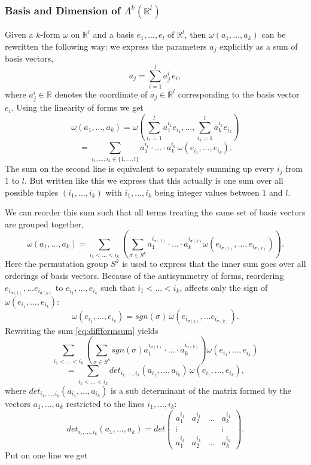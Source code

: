 \subsubsection{Basis and Dimension of $\Lambda^k(\mathbb R^l)$}
Given a $k$-form $\omega$ on $\mathbb R^l$ and a basis $e_1,...,e_l$ of $\mathbb R^l$, then $\omega(a_1,...,a_k)$ can be rewritten the following way: we express the parameters $a_j$ explicitly as a sum of basis vectors,
\[a_j = \sum_{i=1}^l a_j^i\,e_i,\]
where $a_j^i\in \mathbb R$ denotes the coordinate of $a_j \in \mathbb R^l$ corresponding to the basis vector $e_i$.
Using the linearity of forms we get
\[\omega(a_1,...,a_k) = \omega(\sum_{i_1=1}^la_1^{i_1}e_{i_1},...,\sum_{i_k=1}^la_k^{i_k}e_{i_k})\]
\[= \sum_{i_1,...,i_k \in\{1,...,l\}}a_1^{i_1}\cdot ... \cdot a_k^{i_k} \,\omega(e_{i_1},...,e_{i_k}).\]
The sum on the second line is equivalent to  separately summing up every $i_j$ from $1$ to $l$. But written like this we express that this actually is one sum over all possible tuples $(i_1,...,i_k)$ with $i_1,...,i_k$ being integer values between $1$ and $l$.

We can reorder this sum such that all terms treating the same set of basis vectors are grouped together,
\begin{equation}\omega(a_1,...,a_k) =\sum_{i_1<...<i_k}\left(\sum_{\sigma \in S^k} a_1^{i_{\sigma(1)}}\cdot ... \cdot a_k^{i_{\sigma(k)}} \omega(e_{i_{\sigma(1)}},...,e_{i_{\sigma(k)}})\right).\label{eq:diffformsum}\end{equation}
Here the permutation group $S^k$ is used to express that the inner sum goes over all orderings of basis vectors. Because of the antisymmetry of forms, reordering $e_{i_{\sigma(1)}},...e_{i_{\sigma(k)}}$ to $e_{i_1},...,e_{i_k}$ such that $i_1<...<i_k$, affects only the sign of $\omega(e_{i_1},...,e_{i_k})$:
\[\omega(e_{i_1},...,e_{i_k}) = sgn(\sigma)\,\omega(e_{i_{\sigma(1)}},...e_{i_{\sigma(k)}}).\]
Rewriting the sum \ref{eq:diffformsum} yields
\[\sum_{i_1<...<i_k}\left(\sum_{\sigma \in S^k} sgn(\sigma) a_1^{i_{\sigma(1)}}\cdot ... \cdot a_k^{i_{\sigma(k)}}\right) \omega(e_{i_1},...,e_{i_k})\]
\[ = \sum_{i_1<...<i_k} det_{i_1,...,i_k}(a_{i_1},...,a_{i_{k}}) \,\omega(e_{i_1},...,e_{i_k}),\]
where $det_{i_1,...,i_k}(a_{i_1},...,a_{i_{k}})$ is a sub determinant of the matrix formed by the vectors $a_1,...,a_k$ restricted to the lines $i_1,...,i_k$:
\[det_{i_1,...,i_k}(a_1,...,a_k) = det \begin{pmatrix}
a_1^{i_1} &a_2^{i_1} &...&a_k^{i_1} \\
\vdots & & & \vdots \\
a_1^{i_k} &a_2^{i_k} &...&a_k^{i_k} 
\end{pmatrix}.\]
Put on one line we get

